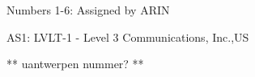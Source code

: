 Numbers 1-6: Assigned by ARIN

AS1: LVLT-1 - Level 3 Communications, Inc.,US

** uantwerpen nummer? **

